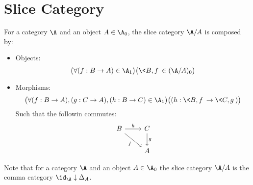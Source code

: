 \chapter{Slice Category}

\begin{definition}
  For a category $\A$ and an object $A\in\A_0$, the slice category $\A/A$ is
  composed by:
  \begin{itemize}
    \item Objects:
      \[\big(\forall (f: B \to A)\in \A_1\big)
        \big(\<B, f\>\in (\A/A)_0\big)\]
    \item Morphisms:
      \[
        \big(\forall (f: B \to A), (g: C\to A), (h: B\to C)\in \A_1\big)
        \big((h: \<B,f\> \to \<C, g\>)\big)
      \]
      Such that the followin commutes:
      \[\begin{tikzcd}[ampersand replacement=\&]
        B \& C \\
        \& A
        \arrow["f"', from=1-1, to=2-2]
        \arrow["g", from=1-2, to=2-2]
        \arrow["h", from=1-1, to=1-2]
      \end{tikzcd}\]
  \end{itemize}
\end{definition}

\begin{remark}
  Note that for a category $\A$ and an object $A\in \A_0$ the slice category
  $\A/A$ is the comma category $\id_\A \downarrow \Delta_A$.
\end{remark}